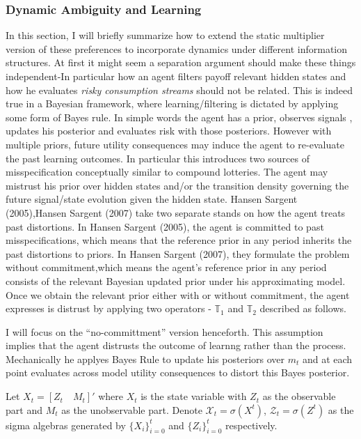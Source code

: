 \documentclass[12pt]{article}
\begin{document}
\subsubsection{Dynamic Ambiguity and Learning}
\label{sec:Dynamic-Amb-Learning}
In this section, I will briefly summarize how to extend the static multiplier version of these preferences to incorporate dynamics under different information structures. At first it might seem a separation argument should make these things independent-In particular how an agent filters payoff relevant hidden states and how he evaluates \emph{ risky consumption streams} should not be related. This is indeed true in a Bayesian framework, where learning/filtering is dictated by applying some form of Bayes rule. In simple words the agent has a prior, observes signals , updates his posterior and evaluates risk with those posteriors. However with multiple priors, future utility consequences may induce the agent to re-evaluate the past learning outcomes. In particular this introduces two sources of misspecification conceptually similar to compound lotteries. The agent may mistrust his prior over hidden states and/or the transition density governing the future signal/state evolution given the  hidden state. Hansen 
Sargent (2005),Hansen Sargent (2007) take two separate stands on how the agent treats past distortions. In Hansen Sargent (2005), the agent is committed to past misspecifications, which means that the reference prior in any period inherits the past distortions to priors. In Hansen Sargent (2007), they formulate the problem without commitment,which means the agent's reference prior in any period consists of the relevant Bayesian updated prior under his approximating model. Once we obtain the relevant prior either with or without commitment, the agent expresses is distrust by applying two operators - $\mathbb{T}_1$ and $\mathbb{T}_2$  described as follows.

I will focus on the ``no-committment'' version henceforth. This assumption implies that the agent distrusts the outcome of learnng rather than the process. Mechanically he applyes Bayes Rule to update his posteriors over $m_t$ and at each point evaluates across model utility consequences to distort this Bayes posterior. 


\noindent Let $X_t=[Z_t \quad M_t]'$ where $X_t$ is the state variable with $Z_t$ as the observable part and $M_t$ as the unobservable part. Denote $\mathcal{X}_t = \sigma(X^t)$, $\mathcal{Z}_t=\sigma(Z^t)$ as the sigma algebras generated by $\{X_i\}^{t}_{i=0}$ and $\{Z_i\}^{t}_{i=0}$ respectively. 
\end{document}
